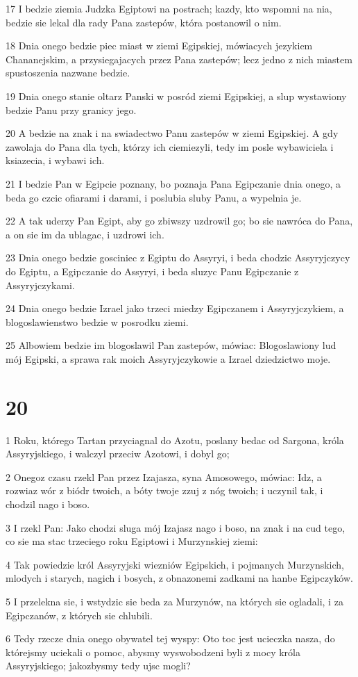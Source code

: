 \par 17 I bedzie ziemia Judzka Egiptowi na postrach; kazdy, kto wspomni na nia, bedzie sie lekal dla rady Pana zastepów, która postanowil o nim.
\par 18 Dnia onego bedzie piec miast w ziemi Egipskiej, mówiacych jezykiem Chananejskim, a przysiegajacych przez Pana zastepów; lecz jedno z nich miastem spustoszenia nazwane bedzie.
\par 19 Dnia onego stanie oltarz Panski w posród ziemi Egipskiej, a slup wystawiony bedzie Panu przy granicy jego.
\par 20 A bedzie na znak i na swiadectwo Panu zastepów w ziemi Egipskiej. A gdy zawolaja do Pana dla tych, którzy ich ciemiezyli, tedy im posle wybawiciela i ksiazecia, i wybawi ich.
\par 21 I bedzie Pan w Egipcie poznany, bo poznaja Pana Egipczanie dnia onego, a beda go czcic ofiarami i darami, i poslubia sluby Panu, a wypelnia je.
\par 22 A tak uderzy Pan Egipt, aby go zbiwszy uzdrowil go; bo sie nawróca do Pana, a on sie im da ublagac, i uzdrowi ich.
\par 23 Dnia onego bedzie gosciniec z Egiptu do Assyryi, i beda chodzic Assyryjczycy do Egiptu, a Egipczanie do Assyryi, i beda sluzyc Panu Egipczanie z Assyryjczykami.
\par 24 Dnia onego bedzie Izrael jako trzeci miedzy Egipczanem i Assyryjczykiem, a blogoslawienstwo bedzie w posrodku ziemi.
\par 25 Albowiem bedzie im blogoslawil Pan zastepów, mówiac: Blogoslawiony lud mój Egipski, a sprawa rak moich Assyryjczykowie a Izrael dziedzictwo moje.

\chapter{20}

\par 1 Roku, którego Tartan przyciagnal do Azotu, poslany bedac od Sargona, króla Assyryjskiego, i walczyl przeciw Azotowi, i dobyl go;
\par 2 Onegoz czasu rzekl Pan przez Izajasza, syna Amosowego, mówiac: Idz, a rozwiaz wór z biódr twoich, a bóty twoje zzuj z nóg twoich; i uczynil tak, i chodzil nago i boso.
\par 3 I rzekl Pan: Jako chodzi sluga mój Izajasz nago i boso, na znak i na cud tego, co sie ma stac trzeciego roku Egiptowi i Murzynskiej ziemi:
\par 4 Tak powiedzie król Assyryjski wiezniów Egipskich, i pojmanych Murzynskich, mlodych i starych, nagich i bosych, z obnazonemi zadkami na hanbe Egipczyków.
\par 5 I przelekna sie, i wstydzic sie beda za Murzynów, na których sie ogladali, i za Egipczanów, z których sie chlubili.
\par 6 Tedy rzecze dnia onego obywatel tej wyspy: Oto toc jest ucieczka nasza, do którejsmy uciekali o pomoc, abysmy wyswobodzeni byli z mocy króla Assyryjskiego; jakozbysmy tedy ujsc mogli?


